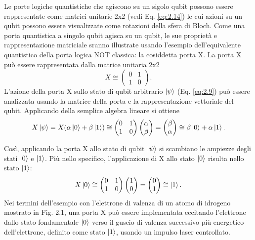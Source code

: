 Le porte logiche quantistiche che agiscono su un sigolo qubit possono essere 
rappresentate come matrici unitarie 2x2 (vedi Eq. \ref{eq:2.14}) le cui azioni 
su un qubit possono essere visualizzate come rotazioni della sfera di Bloch. 
Come una porta quantistica a singolo qubit agisca su un qubit, le sue 
proprietà e rappresentazione matriciale sranno illustrate usando l'esempio 
dell'equivalente quantistico della porta logica NOT classica: la cosiddetta 
porta X. La porta X può essere rappresentata dalla matrice unitaria 2x2 
\begin{equation} \label{eq:2.28}
    X \cong 
    \begin{pmatrix}
        0&1\\1&0
    \end{pmatrix}
    .
\end{equation}
L'azione della porta X sullo stato di qubit arbitrario $\ket{\psi}$ 
(Eq. \ref{eq:2.9}) può essere analizzata usando la matrice della porta e la 
rappresentazione vettoriale del qubit. Applicando della semplice algebra lineare 
si ottiene 
\begin{equation} \label{eq:2.29}
    X \ket{\psi} = X (\alpha \ket{0} + \beta \ket{1}) \cong 
    \begin{pmatrix}
        0&1\\1&0
    \end{pmatrix}
    \begin{pmatrix}
        \alpha \\ \beta
    \end{pmatrix}
    = 
    \begin{pmatrix}
        \beta \\ \alpha
    \end{pmatrix}
    \cong \beta \ket{0} + \alpha \ket{1}.
\end{equation}

Così, applicando la porta X allo stato di qubit $\ket{\psi}$ si scambiano le 
ampiezze degli stati $\ket{0}$ e $\ket{1}$. Più nello specifico, l'applicazione 
di X allo stato $\ket{0}$ risulta nello stato $\ket{1}$: 
\begin{equation} \label{eq:2.30}
    X \ket{0} \cong 
    \begin{pmatrix}
        0&1\\1&0
    \end{pmatrix}
    \begin{pmatrix}
        1\\0
    \end{pmatrix}
    =
    \begin{pmatrix}
        0\\1
    \end{pmatrix}
    \cong \ket{1}.
\end{equation}
Nei termini dell'esempio con l'elettrone di valenza di un atomo di idrogeno 
mostrato in Fig. 2.1, una porta X può essere implementata eccitando l'elettrone 
dallo stato fondamentale $\ket{0}$ verso il guscio di valenza successivo più 
energetico dell'elettrone, definito come stato $\ket{1}$, usando un impulso 
laser controllato. 

